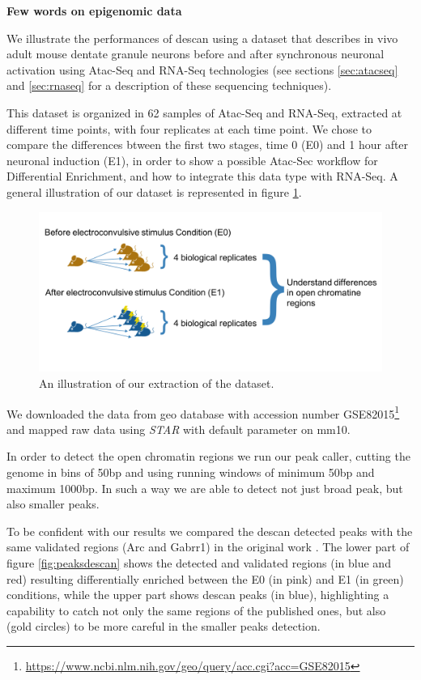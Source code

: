 \textbf{Few words on epigenomic data}

We illustrate the performances of \gls{descan} using a dataset \cite{Su2017} that describes in vivo adult mouse dentate granule neurons before and after synchronous neuronal activation using Atac-Seq and RNA-Seq technologies (see sections \ref{sec:atacseq} and \ref{sec:rnaseq} for a description of these sequencing techniques).

This dataset is organized in 62 samples of Atac-Seq and RNA-Seq, extracted at different time points, with four replicates at each time point.
We chose to compare the differences btween the first two stages, time 0 (E0) and 1 hour after neuronal induction (E1), in order to show a possible Atac-Sec workflow for Differential Enrichment, and how to integrate this data type with RNA-Seq. A general illustration of our dataset is represented in figure \ref{fig:atacdataset}.

\begin{figure}[H]
\includegraphics[width=\textwidth,height=\textheight,keepaspectratio]{img/descan2/dataset.png}
\caption[DEScan2 dataset illustration]{An illustration of our extraction of the \cite{Su2017} dataset.}
\label{fig:atacdataset}
\centering
\end{figure}

We downloaded the data from \gls{geo} database \cite{Edgar2002, Barrett2013} with accession number GSE82015\footnote{\url{https://www.ncbi.nlm.nih.gov/geo/query/acc.cgi?acc=GSE82015}} and mapped raw data using \textit{STAR} \cite{Dobin2013} with default parameter on \gls{mm10}.

In order to detect the open chromatin regions we run our peak caller, cutting the genome in bins of 50bp and using running windows of minimum 50bp and maximum 1000bp. In such a way we are able to detect not just broad peak, but also smaller peaks.

To be confident with our results we compared the \gls{descan} detected peaks with the same validated regions (Arc and Gabrr1) in the original work \cite{Su2017}.
The lower part of figure \ref{fig:peaksdescan} shows the detected and validated regions (in blue and red) resulting differentially enriched between the E0 (in pink) and E1 (in green) conditions, while the upper part shows \gls{descan} peaks (in blue), highlighting a capability to catch not only the same regions of the published ones, but also (gold circles) to be more careful in the smaller peaks detection.

